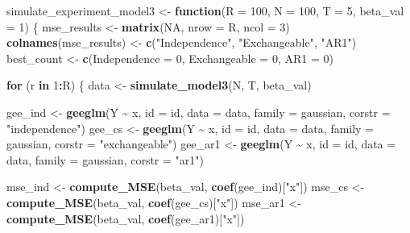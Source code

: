 \documentclass[
]{article}
\newenvironment{Shaded}{\begin{snugshade}}{\end{snugshade}}
\newcommand{\AttributeTok}[1]{\textcolor[rgb]{0.13,0.29,0.53}{#1}}
\newcommand{\ConstantTok}[1]{\textcolor[rgb]{0.56,0.35,0.01}{#1}}
\newcommand{\ControlFlowTok}[1]{\textcolor[rgb]{0.13,0.29,0.53}{\textbf{#1}}}
\newcommand{\DecValTok}[1]{\textcolor[rgb]{0.00,0.00,0.81}{#1}}
\newcommand{\FunctionTok}[1]{\textcolor[rgb]{0.13,0.29,0.53}{\textbf{#1}}}
\newcommand{\NormalTok}[1]{#1}
\newcommand{\OtherTok}[1]{\textcolor[rgb]{0.56,0.35,0.01}{#1}}
\newcommand{\SpecialCharTok}[1]{\textcolor[rgb]{0.81,0.36,0.00}{\textbf{#1}}}
\newcommand{\StringTok}[1]{\textcolor[rgb]{0.31,0.60,0.02}{#1}}
\begin{document}
\begin{Shaded}
\begin{Highlighting}[]
\NormalTok{simulate\_experiment\_model3 }\OtherTok{\textless{}{-}} \ControlFlowTok{function}\NormalTok{(}\AttributeTok{R =} \DecValTok{100}\NormalTok{, }\AttributeTok{N =} \DecValTok{100}\NormalTok{, }\AttributeTok{T =} \DecValTok{5}\NormalTok{, }\AttributeTok{beta\_val =} \DecValTok{1}\NormalTok{) \{}
\NormalTok{  mse\_results }\OtherTok{\textless{}{-}} \FunctionTok{matrix}\NormalTok{(}\ConstantTok{NA}\NormalTok{, }\AttributeTok{nrow =}\NormalTok{ R, }\AttributeTok{ncol =} \DecValTok{3}\NormalTok{)}
  \FunctionTok{colnames}\NormalTok{(mse\_results) }\OtherTok{\textless{}{-}} \FunctionTok{c}\NormalTok{(}\StringTok{"Independence"}\NormalTok{, }\StringTok{"Exchangeable"}\NormalTok{, }\StringTok{"AR1"}\NormalTok{)}
\NormalTok{  best\_count }\OtherTok{\textless{}{-}} \FunctionTok{c}\NormalTok{(}\AttributeTok{Independence =} \DecValTok{0}\NormalTok{, }\AttributeTok{Exchangeable =} \DecValTok{0}\NormalTok{, }\AttributeTok{AR1 =} \DecValTok{0}\NormalTok{)}
  
  \ControlFlowTok{for}\NormalTok{ (r }\ControlFlowTok{in} \DecValTok{1}\SpecialCharTok{:}\NormalTok{R) \{}
\NormalTok{    data }\OtherTok{\textless{}{-}} \FunctionTok{simulate\_model3}\NormalTok{(N, T, beta\_val)}

\NormalTok{    gee\_ind }\OtherTok{\textless{}{-}} \FunctionTok{geeglm}\NormalTok{(Y }\SpecialCharTok{\textasciitilde{}}\NormalTok{ x, }\AttributeTok{id =}\NormalTok{ id, }\AttributeTok{data =}\NormalTok{ data, }\AttributeTok{family =}\NormalTok{ gaussian, }\AttributeTok{corstr =} \StringTok{"independence"}\NormalTok{)}
\NormalTok{    gee\_cs  }\OtherTok{\textless{}{-}} \FunctionTok{geeglm}\NormalTok{(Y }\SpecialCharTok{\textasciitilde{}}\NormalTok{ x, }\AttributeTok{id =}\NormalTok{ id, }\AttributeTok{data =}\NormalTok{ data, }\AttributeTok{family =}\NormalTok{ gaussian, }\AttributeTok{corstr =} \StringTok{"exchangeable"}\NormalTok{)}
\NormalTok{    gee\_ar1 }\OtherTok{\textless{}{-}} \FunctionTok{geeglm}\NormalTok{(Y }\SpecialCharTok{\textasciitilde{}}\NormalTok{ x, }\AttributeTok{id =}\NormalTok{ id, }\AttributeTok{data =}\NormalTok{ data, }\AttributeTok{family =}\NormalTok{ gaussian, }\AttributeTok{corstr =} \StringTok{"ar1"}\NormalTok{)}

\NormalTok{    mse\_ind }\OtherTok{\textless{}{-}} \FunctionTok{compute\_MSE}\NormalTok{(beta\_val, }\FunctionTok{coef}\NormalTok{(gee\_ind)[}\StringTok{"x"}\NormalTok{])}
\NormalTok{    mse\_cs  }\OtherTok{\textless{}{-}} \FunctionTok{compute\_MSE}\NormalTok{(beta\_val, }\FunctionTok{coef}\NormalTok{(gee\_cs)[}\StringTok{"x"}\NormalTok{])}
\NormalTok{    mse\_ar1 }\OtherTok{\textless{}{-}} \FunctionTok{compute\_MSE}\NormalTok{(beta\_val, }\FunctionTok{coef}\NormalTok{(gee\_ar1)[}\StringTok{"x"}\NormalTok{])}
    

\end{Highlighting}
\end{Shaded}
\end{document}
